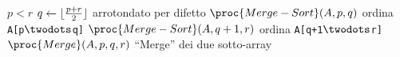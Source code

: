 \begin{codebox}
\li \If $p < r$
\li \Then
        $q \gets \lfloor\frac{p+r}{2}\rfloor$ 
       		\Comment arrotondato per difetto
\li     $\proc{Merge-Sort}(A,p,q)$
       		\Comment ordina \texttt{A[p$\twodots$q]}
\li     $\proc{Merge-Sort}(A,q+1,r)$
       		\Comment ordina \texttt{A[q+1$\twodots$r]}
\li     $\proc{Merge}(A,p,q,r)$
       		\Comment ``Merge'' dei due sotto-array 
    \End
\end{codebox}